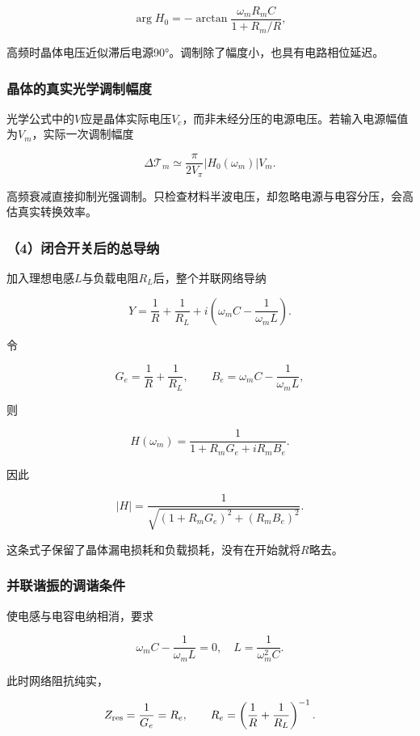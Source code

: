 \documentclass[12pt,a4paper,fontset=fandol]{ctexart}
\begin{document}
\[
\arg H_0=-\arctan\frac{\omega_mR_mC}{1+R_m/R},
\]

高频时晶体电压近似滞后电源90°。调制除了幅度小，也具有电路相位延迟。

\subsubsection{晶体的真实光学调制幅度}\label{ux6676ux4f53ux7684ux771fux5b9eux5149ux5b66ux8c03ux5236ux5e45ux5ea6}

光学公式中的\(V\)应是晶体实际电压\(V_c\)，而非未经分压的电源电压。若输入电源幅值为\(V_m\)，实际一次调制幅度

\[
\Delta\mathcal T_m
\simeq\frac{\pi}{2V_\pi}|H_0(\omega_m)|V_m.
\]

高频衰减直接抑制光强调制。只检查材料半波电压，却忽略电源与电容分压，会高估真实转换效率。

\subsubsection{（4）闭合开关后的总导纳}\label{ux95edux5408ux5f00ux5173ux540eux7684ux603bux5bfcux7eb3}

加入理想电感\(L\)与负载电阻\(R_L\)后，整个并联网络导纳

\[
\boxed{
Y=\frac1R+\frac1{R_L}
+i\left(\omega_mC-\frac1{\omega_mL}\right)}.
\]

令

\[
G_e=\frac1R+\frac1{R_L},\qquad
B_e=\omega_mC-\frac1{\omega_mL},
\]

则

\[
\boxed{
H(\omega_m)=
\frac1{1+R_mG_e+iR_mB_e}}.
\]

因此

\[
\boxed{
|H|=
\frac1{\sqrt{(1+R_mG_e)^2+(R_mB_e)^2}}}.
\]

这条式子保留了晶体漏电损耗和负载损耗，没有在开始就将\(R\)略去。

\subsubsection{并联谐振的调谐条件}\label{ux5e76ux8054ux8c10ux632fux7684ux8c03ux8c10ux6761ux4ef6}

使电感与电容电纳相消，要求

\[
\boxed{\omega_mC-\frac1{\omega_mL}=0},
\quad
\boxed{L=\frac1{\omega_m^2C}}.
\]

此时网络阻抗纯实，

\[
Z_{\rm res}=\frac1{G_e}
=R_e,\qquad
R_e=\left(\frac1R+\frac1{R_L}\right)^{-1}.
\]
\end{document}
